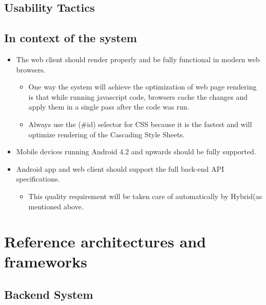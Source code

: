 \documentclass[a4paper,10pt]{article}
\begin{document}
\subsection{Usability Tactics}
	\subsection{In context of the system}
		\begin{itemize}
			\item The web client should render properly and be fully functional in modern web browsers.
				\begin{itemize}
					\item  One way the system will achieve the optimization of web page rendering is that while running javascript code, browsers cache the changes and apply them in a single pass after the code was run. 
					\item Always use the (\#id) selector for CSS because it is the fastest and will optimize rendering of the Cascading Style Sheets. 
				\end{itemize}
			\item Mobile devices running Android 4.2 and upwards should be fully supported.
			\item Android app and web client should support the full back-end API specifications.
				\begin{itemize}
					\item  This quality requirement will be taken care of automatically by Hybrid(as mentioned above.
				\end{itemize}
		\end{itemize}


\section{Reference architectures and frameworks}
\subsection{Backend System}
\end{document}
